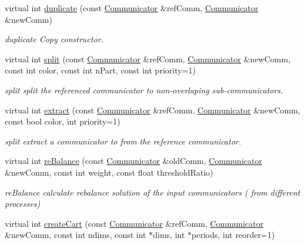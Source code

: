 \begin{DoxyCompactItemize}
virtual int \hyperlink{classHSF_1_1CommunicationManager_aa506879f09f9f0d3853a38bd5957024d}{duplicate} (const \hyperlink{classHSF_1_1Communicator}{Communicator} \&refComm, \hyperlink{classHSF_1_1Communicator}{Communicator} \&newComm)
\begin{DoxyCompactList}\small\item\em duplicate Copy constructor. \item\end{DoxyCompactList}\item 
virtual int \hyperlink{classHSF_1_1CommunicationManager_abf8f44565535ca264f90ea7c44baf618}{split} (const \hyperlink{classHSF_1_1Communicator}{Communicator} \&refComm, \hyperlink{classHSF_1_1Communicator}{Communicator} \&newComm, const int color, const int nPart, const int priority=1)
\begin{DoxyCompactList}\small\item\em split split the referenced communicator to non-\/overlaping sub-\/communicators. \item\end{DoxyCompactList}\item 
virtual int \hyperlink{classHSF_1_1CommunicationManager_ae872cf2b678e8998fcb7b7dcc1a9b2d0}{extract} (const \hyperlink{classHSF_1_1Communicator}{Communicator} \&refComm, \hyperlink{classHSF_1_1Communicator}{Communicator} \&newComm, const bool color, int priority=1)
\begin{DoxyCompactList}\small\item\em split extract a communicator to from the reference communicator. \item\end{DoxyCompactList}\item 
virtual int \hyperlink{classHSF_1_1CommunicationManager_a23ed29de80835c5f413b2fefa2d98bdb}{reBalance} (const \hyperlink{classHSF_1_1Communicator}{Communicator} \&oldComm, \hyperlink{classHSF_1_1Communicator}{Communicator} \&newComm, const int weight, const float thresholdRatio)
\begin{DoxyCompactList}\small\item\em reBalance calculate rebalance solution of the input communicators ( from different processes) \item\end{DoxyCompactList}\item 
virtual int \hyperlink{classHSF_1_1CommunicationManager_a1128786fe9a8887c1e02f00bcabcd0a6}{createCart} (const \hyperlink{classHSF_1_1Communicator}{Communicator} \&refComm, \hyperlink{classHSF_1_1Communicator}{Communicator} \&newComm, const int ndims, const int $\ast$dims, int $\ast$periods, int reorder=1)

\end{DoxyCompactItemize}
